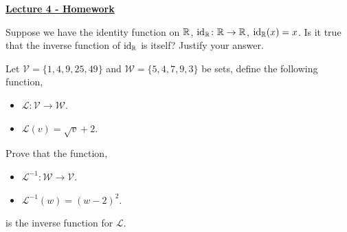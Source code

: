 \documentclass[12pt]{article} %
\begin{document}
	\renewcommand*{\coursecode}{MATH 235} %
	\renewcommand*{\assgnnumber}{Assignment 1} %
	\renewcommand*{\submdate}{September 14, 2021} %
	\renewcommand*{\studentfname}{Abdullah} %
	\renewcommand*{\studentlname}{Zubair} %
    \renewcommand*{\proofname}{Proof:}

	\renewcommand\qedsymbol{$\blacksquare$}
	\setfigpath
	\fancyhfoffset[L,O]{0pt} %




\begin{center}
	\textbf{\underline{\Huge{Lecture 4 - Homework}}}
\end{center}

\begin{qstn}
 Suppose we have the identity function on $\mathbb R$, $\operatorname{id}_\mathbb R \colon \mathbb R \to \mathbb R$, $\operatorname{id}_\mathbb R(x) = x$. 
 Is it true that the inverse function of $\operatorname{id}_\mathbb R$ is itself? Justify your answer.
\end{qstn}

\begin{qstn}
  Let $ \mathcal{V} = \{1,4,9,25,49\} $ and $ \mathcal{W} = \{5,4,7,9,3\} $ be sets, define the following function, 
  \begin{itemize}
    \item $\mathcal{L} \colon \mathcal{V} \to \mathcal{W}$.
    \item $\mathcal{L}(v) = \sqrt{v} + 2$.
  \end{itemize}
  Prove that the function,
  \begin{itemize}
    \item $\mathcal{L}^{-1} \colon \mathcal{W} \to \mathcal{V}$.
    \item $\mathcal{L}^{-1}(w) = (w - 2)^2$.
  \end{itemize}
  is the inverse function for $\mathcal{L}$. 
\end{qstn}
\end{document}
